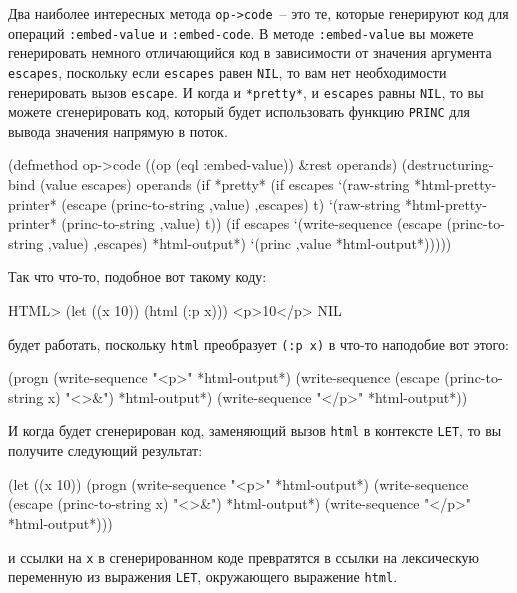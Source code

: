 Два наиболее интересных метода \lstinline{op->code}~-- это те, которые генерируют код для
операций \lstinline{:embed-value} и \lstinline{:embed-code}.  В методе \lstinline{:embed-value} вы
можете генерировать немного отличающийся код в зависимости от значения аргумента
\lstinline{escapes}, поскольку если \lstinline{escapes} равен \lstinline{NIL}, то вам нет необходимости
генерировать вызов \lstinline{escape}.  И когда и \lstinline{*pretty*}, и \lstinline{escapes} равны
\lstinline{NIL}, то вы можете сгенерировать код, который будет использовать функцию
\lstinline{PRINC} для вывода значения напрямую в поток.

\begin{myverb}
(defmethod op->code ((op (eql :embed-value)) &rest operands)
  (destructuring-bind (value escapes) operands
    (if *pretty*
      (if escapes
        `(raw-string *html-pretty-printer* (escape (princ-to-string ,value) ,escapes) t)
        `(raw-string *html-pretty-printer* (princ-to-string ,value) t))
      (if escapes
        `(write-sequence (escape (princ-to-string ,value) ,escapes) *html-output*)
        `(princ ,value *html-output*)))))
\end{myverb}

Так что что-то, подобное вот такому коду:

\begin{myverb}
HTML> (let ((x 10)) (html (:p x)))
<p>10</p>
NIL
\end{myverb}

\noindent{}будет работать, поскольку \lstinline{html} преобразует \lstinline{(:p x)} в
что-то наподобие вот этого:

\begin{myverb}
(progn
  (write-sequence "<p>" *html-output*)
  (write-sequence (escape (princ-to-string x) "<>&") *html-output*)
  (write-sequence "</p>" *html-output*))
\end{myverb}

И когда будет сгенерирован код, заменяющий вызов \lstinline{html} в контексте
\lstinline{LET}, то вы получите следующий результат:

\begin{myverb}
(let ((x 10))
  (progn
    (write-sequence "<p>" *html-output*)
    (write-sequence (escape (princ-to-string x) "<>&") *html-output*)
    (write-sequence "</p>" *html-output*)))
\end{myverb}

\noindent{}и ссылки на \lstinline{x} в сгенерированном коде превратятся в ссылки на лексическую переменную
из выражения \lstinline{LET}, окружающего выражение \lstinline{html}.

